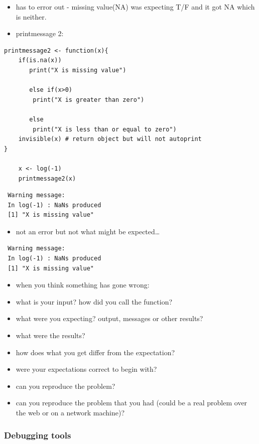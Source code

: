 \documentclass[11pt]{article}
\begin{document}
\begin{itemize}
\item has to error out - missing value(NA) was expecting T/F and it got
  NA which is neither.
\item printmessage 2:
\end{itemize}


\begin{verbatim}
printmessage2 <- function(x){
    if(is.na(x))
       print("X is missing value")

       else if(x>0)
        print("X is greater than zero")

       else
        print("X is less than or equal to zero")
    invisible(x) # return object but will not autoprint
}

    x <- log(-1)
    printmessage2(x)
\end{verbatim}

\begin{verbatim}
 Warning message:
 In log(-1) : NaNs produced
 [1] "X is missing value"
\end{verbatim}

\begin{itemize}
\item not an error but not what might be expected\ldots{}
\end{itemize}
\begin{verbatim}
 Warning message:
 In log(-1) : NaNs produced
 [1] "X is missing value"
\end{verbatim}

\begin{itemize}
\item when you think something has gone wrong:
\item what is your input? how did you call the function?
\item what were you expecting? output, messages or other results?
\item what were the results?
\item how does what you get differ from the expectation?
\item were your expectations correct to begin with?
\item can you reproduce the problem?
\item can you reproduce the problem that you had (could be a real problem
  over the web or on a network machine)?
\end{itemize}
\subsubsection{Debugging tools}
\label{sec-2-5-2}
\end{document}
